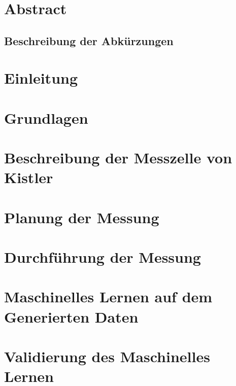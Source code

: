 \documentclass[a4paper,12pt]{article}
\begin{document}
\begin{titlepage}
  \end{titlepage}



\pagestyle{empty}
\section*{Abstract}

\subsection*{Beschreibung der Abkürzungen}

\tableofcontents
\newpage
\pagestyle{fancy}

\setcounter{page}{1}
\section{Einleitung}


\section{Grundlagen}

\newpage

\newpage

\newpage

\newpage
\section{Beschreibung der Messzelle von Kistler}

\newpage
\section{Planung der Messung}

\newpage
\section{Durchführung der Messung}




\newpage
\section{Maschinelles Lernen auf dem Generierten Daten}

\newpage
\section{Validierung des Maschinelles Lernen}

\newpage
\end{document}
